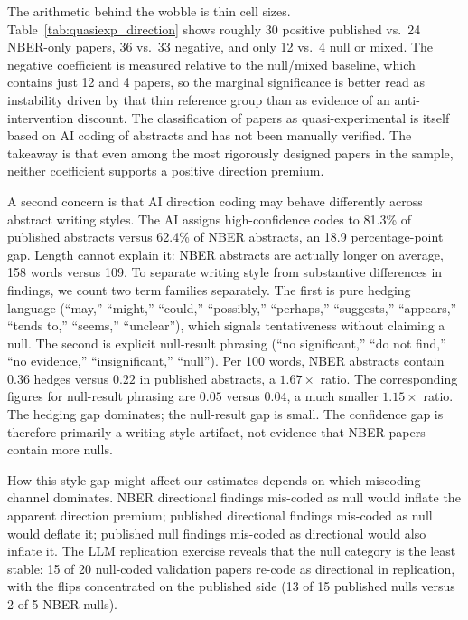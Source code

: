 \documentclass[12pt]{article}
\begin{document}
The arithmetic behind the wobble is thin cell sizes.
Table~\ref{tab:quasiexp_direction} shows roughly 30 positive
published vs.\ 24 NBER-only papers, 36 vs.\ 33 negative, and only
12 vs.\ 4 null or mixed.  The negative coefficient is measured
relative to the null/mixed baseline, which contains just 12 and 4
papers, so the marginal significance is better read as instability
driven by that thin reference group than as evidence of an
anti-intervention discount.  The classification of papers as
quasi-experimental is itself based on AI coding of abstracts and
has not been manually verified.  The takeaway is that even among
the most rigorously designed papers in the sample, neither
coefficient supports a positive direction premium.

A second concern is that AI direction coding may behave differently
across abstract writing styles.  The AI assigns high-confidence
codes to 81.3\% of published abstracts versus 62.4\% of NBER
abstracts, an 18.9 percentage-point gap.  Length cannot explain it:
NBER abstracts are actually longer on average, 158 words versus 109.
To separate writing style from substantive differences in findings,
we count two term families separately.  The first is pure hedging
language (``may,'' ``might,'' ``could,'' ``possibly,'' ``perhaps,''
``suggests,'' ``appears,'' ``tends to,'' ``seems,'' ``unclear''),
which signals tentativeness without claiming a null.  The second is
explicit null-result phrasing (``no significant,'' ``do not find,''
``no evidence,'' ``insignificant,'' ``null'').  Per 100 words, NBER
abstracts contain $0.36$ hedges versus $0.22$ in published
abstracts, a $1.67\times$ ratio.  The corresponding figures for
null-result phrasing are $0.05$ versus $0.04$, a much smaller
$1.15\times$ ratio.  The hedging gap dominates; the null-result
gap is small.  The confidence gap is therefore primarily a
writing-style artifact, not evidence that NBER papers contain more
nulls.

How this style gap might affect our estimates depends on which
miscoding channel dominates.  NBER directional findings mis-coded
as null would inflate the apparent direction premium; published
directional findings mis-coded as null would deflate it; published
null findings mis-coded as directional would also inflate it.  The
LLM replication exercise reveals that the null category is the
least stable: 15 of 20 null-coded validation papers re-code as
directional in replication, with the flips concentrated on the
published side (13 of 15 published nulls versus 2 of 5 NBER nulls).
\end{document}
